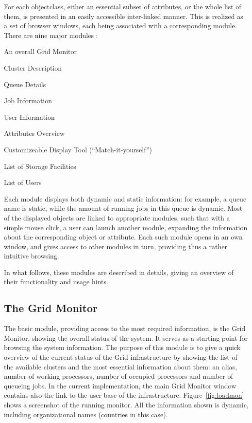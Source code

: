 \documentclass{article}
\begin{document}
For each objectclass, either an essential subset of attributes, or the
whole list of them, is presented in an easily accessible inter-linked
manner. This is realized as a set of browser windows, each being associated
with a corresponding module. There are nine major modules
: 
\begin{list}{)}{ \itemsep=-0.5mm}
\item An overall Grid Monitor
\item Cluster Description
\item Queue Details
\item Job Information
\item User Information
\item Attributes Overview
\item Customizeable Display Tool (``Match-it-yourself'')
\item List of Storage Facilities
\item List of Users
\end{list}
Each module displays both dynamic and static information: for example,
a queue name is static, while the amount of running jobs in this queue
is dynamic. Most of the displayed objects are linked to appropriate
modules, such that with a simple mouse click, a user can launch
another module, expanding the information about the corresponding
object or attribute. Each such module opens in an own window, and
gives access to other modules in turn, providing thus a rather
intuitive browsing.

In what follows, these modules are described in details, giving an
overview of their functionality and usage hints.

\subsection{The Grid Monitor}
\label{sec:loadmon}

The basic module,  providing access to the most
required information, is the Grid Monitor, showing the overall status
of the system. It serves as a starting point for browsing the system
information. The purpose of this module is to give a quick overview of
the current status of the Grid infrastructure by showing the list of the
available clusters and the most essential information about them: an
alias, number of working processors, number of occupied processors and
number of queueing jobs. In the current implementation, the main Grid
Monitor window contains also the link to the user base of the infrastructure. 
Figure~\ref{fig:loadmon} shows a screenshot of the running
monitor. All the information shown is dynamic, including
organizational names (countries in this case).
\end{document}
